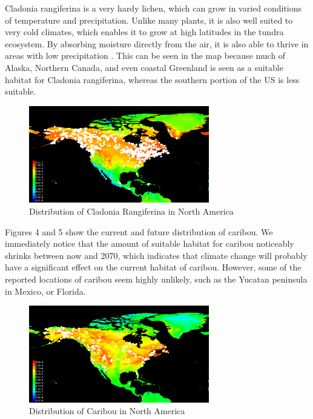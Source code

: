 \documentclass[twoside]{article}
\begin{document}
\indent Cladonia rangiferina is a very hardy lichen, which can grow in varied conditions
of temperature and precipitation. Unlike many plants, it is also well suited
to very cold climates, which enables it to grow at high latitudes in the
tundra ecosystem. By absorbing moisture directly from the air, it is also able
to thrive in areas with low precipitation \cite{usfs}. This can be
seen in the map because much of Alaska, Northern Canada, and even coastal
Greenland is seen as a suitable habitat for Cladonia rangiferina, whereas
the southern portion of the US is less suitable. \\

\begin{figure}[!ht]
\centering
\includegraphics[width=0.7\textwidth]{NCladoniaFuture}
\caption{Distribution of Cladonia Rangiferina in North America}
\end{figure}

\indent Figures 4 and 5 show the current and future distribution of caribou. We
immediately notice that the amount of suitable habitat for caribou noticeably
shrinks between now and 2070, which indicates that climate change will probably
have a significant effect on the current habitat of caribou. However, some of
the reported locations of caribou seem highly unlikely, such as the Yucatan
peninsula in Mexico, or Florida.

\begin{figure}[!ht]
\centering
\includegraphics[width=0.7\textwidth]{NCaribouPresent}
\caption{Distribution of Caribou in North America}
\end{figure}
\end{document}
